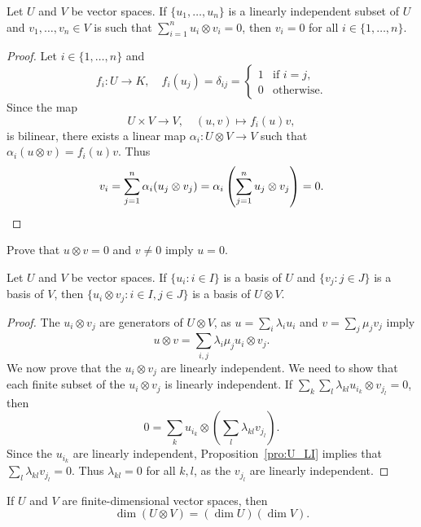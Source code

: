 \begin{proposition}
	\label{pro:U_LI}
	Let $U$ and $V$ be vector spaces. 
	If $\{u_1,\dots,u_n\}$ is a linearly independent subset of $U$ and 
	$v_1,\dots,v_n\in V$ is such that $\sum_{i=1}^n u_i\otimes v_i=0$, then 
    $v_i=0$ for all $i\in\{1,\dots,n\}$.
\end{proposition}

\begin{proof}
	Let $i\in\{1,\dots,n\}$ and 
	\[
	f_i\colon U\to K,
	\quad
	f_i(u_j)=\delta_{ij}=\begin{cases}
	1 & \text{if $i=j$},\\
	0 & \text{otherwise}.
	\end{cases}
	\]
	Since the map 
 \[
 U\times V\to V,\quad (u,v)\mapsto f_i(u)v,
 \]
 is bilinear, there exists 
	a linear map 
	$\alpha_i\colon U\otimes V\to V$ such that $\alpha_i(u\otimes
	v)=f_i(u)v$. Thus
	\[
		v_i=\sum_{j=1}^n\alpha_i(u_j\otimes v_j)=\alpha_i\left(\sum_{j=1}^nu_j\otimes v_j\right)=0.\qedhere
	\]
\end{proof}

\begin{exercise}
	\label{xca:uxv=0}
	Prove that $u\otimes v=0$ and $v\ne 0$ imply $u=0$.
\end{exercise}

\begin{theorem}
    Let $U$ and $V$ be vector spaces. 
	If $\{u_i:i\in I\}$ is a basis of $U$ and $\{v_j:j\in J\}$ is a basis of $V$, then 
	$\{u_i\otimes v_j:i\in I,j\in J\}$ is a basis of $U\otimes
	V$.
\end{theorem}

\begin{proof}
	The $u_i\otimes v_j$ are generators of $U\otimes V$, as  
    $u=\sum_i\lambda_iu_i$ and $v=\sum_j\mu_jv_j$ imply 
	\[
    u\otimes v=\sum_{i,j}\lambda_i\mu_ju_i\otimes v_j.
    \]
	We now prove that the $u_i\otimes v_j$ are linearly independent. We need to show that
	each finite subset of the $u_i\otimes v_j$
	is linearly independent. If $\sum_k\sum_l\lambda_{kl}u_{i_k}\otimes
	v_{j_l}=0$, then 
	\[
0=\sum_{k}u_{i_k}\otimes\left(\sum_{l}\lambda_{kl}v_{j_l}\right).\]
    Since  
	the $u_{i_k}$ are linearly independent, Proposition~\ref{pro:U_LI}
	implies that $\sum_{l}\lambda_{kl}v_{j_l}=0$. Thus $\lambda_{kl}=0$ for all 
	$k,l$, as the $v_{j_l}$ are linearly independent. 
\end{proof}

If $U$ and $V$ are finite-dimensional vector spaces, then 
\[
	\dim(U\otimes V)=(\dim U)(\dim V).
\]

